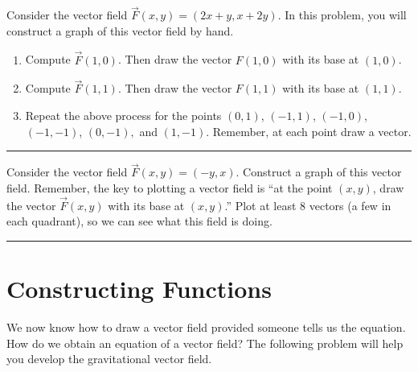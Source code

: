 \begin{problem}%
%
 Consider the vector field $\vec F(x,y)=(2x+y,x+2y)$.  In this problem, you will construct a graph of this vector field by hand.
\begin{enumerate}
 \item Compute $\vec F(1,0)$. Then draw the vector $F(1,0)$ with its base at $(1,0)$.
 \item Compute $\vec F(1,1)$. Then draw the vector $F(1,1)$ with its base at $(1,1)$.
 \item Repeat the above process for the points $(0,1)$, $(-1,1)$, $(-1,0)$, $(-1,-1)$, $(0,-1),$ and $(1,-1)$. Remember, at each point draw a vector.  
\end{enumerate}
\hrule\end{problem}

\begin{problem}%
 Consider the vector field $\vec F(x,y)=(-y,x)$. Construct a graph of this vector field. Remember, the key to plotting a vector field is ``at the point $(x,y)$, draw the vector $\vec F(x,y)$ with its base at $(x,y)$.''  Plot at least 8 vectors (a few in each quadrant), so we can see what this field is doing.
\hrule\end{problem}

\section{Constructing Functions}
We now know how to draw a vector field provided someone tells us the equation. How do we obtain an equation of a vector field? The following problem will help you develop the gravitational vector field.

